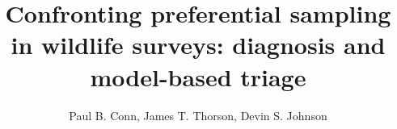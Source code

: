\documentclass[times,mee,doublespace,]{besauth2}
\begin{document}


\title{Confronting preferential sampling in wildlife surveys: diagnosis and model-based triage \footnotemark[2]}

\author{Paul B. Conn\corrauth, James T. Thorson, Devin S. Johnson}


\address{Marine Mammal Laboratory, Alaska Fisheries Science Center, NOAA, National Marine Fisheries Service, 7600 Sand Point Way NE, Seattle, WA 98115 USA;  Fisheries Resource Assessment and Monitoring Division (FRAM), Northwest Fisheries Science Center, NOAA, National Marine Fisheries Service,
2725 Montlake Boulevard E, Seattle, WA 98112, USA}

\end{document}

